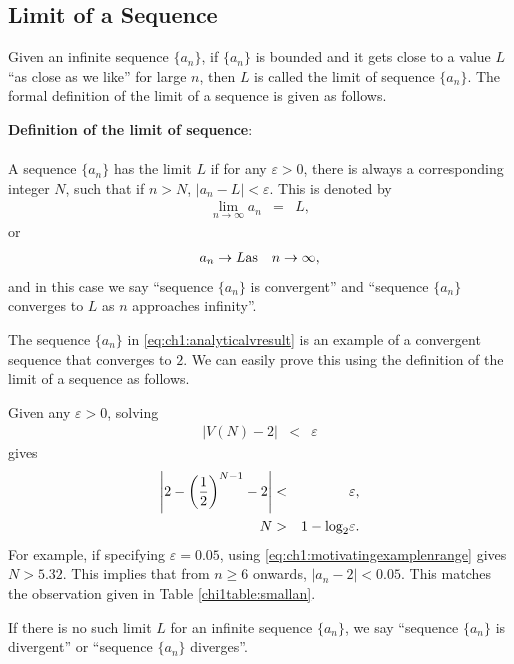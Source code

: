 \subsection{Limit of a Sequence} \label{ch1subsec:definationoflimitofsequence}

Given an infinite sequence $\{a_n\}$, if $\{a_n\}$ is bounded and it gets close to a value $L$ ``as close as we like'' for large $n$, then $L$ is called the limit of sequence $\{a_n\}$. The formal definition of the limit of a sequence is given as follows.

\begin{VF}
\textbf{Definition of the limit of sequence}:
\\
\\
\noindent A sequence $\{a_n\}$ has the limit $L$ if for any $\varepsilon > 0$, there is always a corresponding integer $N$, such that if $n>N$, $|a_n-L|<\varepsilon$. This is denoted by
\begin{eqnarray}
  \lim_{n\rightarrow \infty} a_n &=& L, \nonumber
\end{eqnarray}
or
\begin{eqnarray}
  a_n \rightarrow L  & \textup{as} & n \rightarrow \infty, \nonumber
\end{eqnarray}
and in this case we say ``sequence $\{a_n\}$ is convergent'' and ``sequence $\{a_n\}$ converges to $L$ as $n$ approaches infinity''.
\end{VF}

The sequence $\{a_n\}$ in \eqref{eq:ch1:analyticalvresult} is an example of a convergent sequence that converges to $2$. We can easily prove this using the definition of the limit of a sequence as follows.

Given any $\varepsilon > 0$, solving
\begin{eqnarray}
  |V(N) - 2| &<& \varepsilon \nonumber
\end{eqnarray}
gives
\begin{eqnarray}
  \left|2-\left(\frac{1}{2}\right)^{N-1}-2\right| &<& \varepsilon, \nonumber \\
  N &>& 1-\textup{log}_2\varepsilon. \label{eq:ch1:motivatingexamplenrange}
\end{eqnarray}
For example, if specifying $\varepsilon = 0.05$, using \eqref{eq:ch1:motivatingexamplenrange} gives $N>5.32$. This implies that from $n\geq 6$ onwards, $|a_n-2|<0.05$. This matches the observation given in Table \ref{chi1table:smallan}.

If there is no such limit $L$ for an infinite sequence $\{a_n\}$, we say ``sequence $\{a_n\}$ is divergent'' or ``sequence $\{a_n\}$ diverges''.

